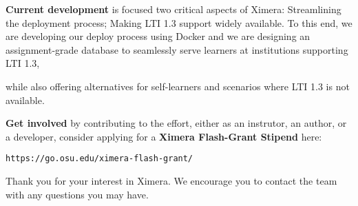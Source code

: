 \documentclass[twocolumn]{article}
\begin{document}
\begin{xframe}
    {\sffamily\bfseries Current development} is focused two critical
    aspects of Ximera: Streamlining the deployment
    process; Making LTI 1.3 support widely available.
    To this end, we are
    developing our
    deploy process using Docker and we are designing an assignment-grade
    database
    to
    seamlessly serve  learners at institutions supporting LTI 1.3,
    \begin{center}
    \end{center}
    while also offering alternatives for self-learners and scenarios where
    LTI
    1.3 is not
    available.
\end{xframe}

\begin{xframe}
    {\sffamily\bfseries Get involved} by contributing to the effort,
    either
    as an instrutor, an author, or a developer, consider
    applying for a \textbf{Ximera Flash-Grant Stipend} here:
    \begin{center}
        \tt  https://go.osu.edu/ximera-flash-grant/
    \end{center}
    Thank you for your interest in Ximera. We encourage you
    to contact the team with  any questions you may have.
\end{xframe}
\end{document}
